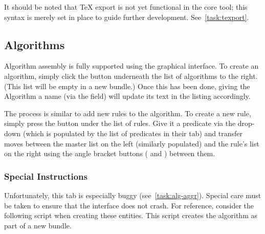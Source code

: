 It should be noted that {\TeX} export is not yet functional in the core tool;
  this syntax is merely set in place to guide further development.
See~\autoref{task:texport}.
\subsection{Algorithms}

Algorithm assembly is fully supported using the graphical interface.
To create an algorithm, simply click the  button
  underneath the list of algorithms to the right.
(This list will be empty in a new bundle.)
Once this has been done, giving the Algorithm a name (via the  field)
  will update its text in the listing accordingly.

The process is similar to add new rules to the algorithm.
To create a new rule, simply press the  button under the list of rules.
Give it a predicate via the drop-down (which is populated by the list of predicates in their tab)
  and transfer moves between the master list on the left (similarly populated) and the rule's list on the right
  using the angle bracket buttons (\menu{{>}} and \menu{{<}}) between them.

\subsubsection{Special Instructions}

Unfortunately, this tab is especially buggy (see~\autoref{task:alg-aggr}).
Special care must be taken to ensure that the interface does not crash.
For reference, consider the following script when creating these entities.
This script creates the algorithm  as part of a new bundle.

